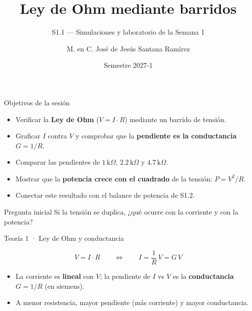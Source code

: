 \documentclass[aspectratio=169]{beamer}
\title[S1.1 · Ley de Ohm]{Ley de Ohm mediante barridos}
\subtitle{S1.1 — Simulaciones y laboratorio de la Semana 1}
\institute{Licenciatura en Ingeniería Aeroespacial\\ UNAM · ENES Unidad Juriquilla}
\author{M. en C. José de Jesús Santana Ramírez}
\date{Semestre 2027-1}
\begin{document}
\begin{frame}[plain]
  \titlepage
\end{frame}

\begin{frame}{Objetivos de la sesión}
  \begin{itemize}
    \item Verificar la \textbf{Ley de Ohm} ($V = I\cdot R$) mediante un barrido de tensión.
    \item Graficar $I$ contra $V$ y comprobar que la \textbf{pendiente es la conductancia} $G = 1/R$.
    \item Comparar las pendientes de $1\,\text{k}\Omega$, $2.2\,\text{k}\Omega$ y $4.7\,\text{k}\Omega$.
    \item Mostrar que la \textbf{potencia crece con el cuadrado} de la tensión: $P = V^2/R$.
    \item Conectar este resultado con el balance de potencia de S1.2.
  \end{itemize}
  \pause
  \begin{block}{Pregunta inicial}
    Si la tensión se duplica, ¿qué ocurre con la corriente y con la potencia?
  \end{block}
\end{frame}

\begin{frame}{Teoría 1 · Ley de Ohm y conductancia}
  \begin{center}
  \end{center}
  \[
    V = I\cdot R
    \qquad\Longleftrightarrow\qquad
    I = \frac{1}{R}\,V = G\,V
  \]
  \pause
  \begin{itemize}
    \item La corriente es \textbf{lineal} con $V$; la pendiente de $I$ vs $V$ es la
      \textbf{conductancia} $G = 1/R$ (en siemens).
    \item A menor resistencia, mayor pendiente (más corriente) y mayor conductancia.
  \end{itemize}
\end{frame}
\end{document}
